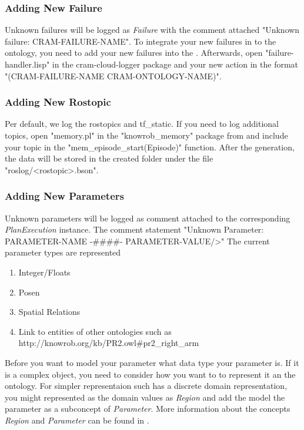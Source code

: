 \subsubsection{Adding New Failure}
Unknown failures will be logged as \textit{Failure} with the comment attached "Unknown failure: CRAM-FAILURE-NAME".
To integrate your new \cram failures in to the ontology, you need to add your new failures into the \cramOwl.
Afterwards, open "failure-handler.lisp" in the cram-cloud-logger package and your new action in the format "(CRAM-FAILURE-NAME CRAM-ONTOLOGY-NAME)".	

\subsubsection{Adding New Rostopic}
Per default, we log the rostopics \tf and tf\_static.
If you need to log additional topics, open "memory.pl" in the "knowrob\_memory" package from \knowrob and include your topic in the "mem\_episode\_start(Episode)" function.
After the \neem generation, the data will be stored in the created \neem folder under the file "roslog/<rostopic>.bson".

\subsubsection{Adding New Parameters}
Unknown parameters will be logged as comment attached to the corresponding \textit{PlanExecution} instance.
The comment statement "Unknown Parameter: PARAMETER-NAME  -\#\#\#\#- PARAMETER-VALUE/>"
The current parameter types are represented 


\begin{enumerate} 
	\item Integer/Floats
	\item Posen
	\item Spatial Relations
	\item Link to entities of other ontologies such as http://knowrob.org/kb/PR2.owl\#pr2\_right\_arm
\end{enumerate}

Before you want to model your parameter what data type your parameter is.
If it is a complex object, you need to consider how you want to to represent it an the ontology.
For simpler representaion such has a discrete domain representation, you might represented as the domain values as \textit{Region} and add the model the parameter as a subconcept of \textit{Parameter}.
More information about the concepts \textit{Region} and \textit{Parameter} can be found in .


